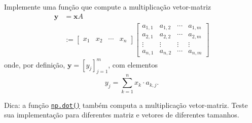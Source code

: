 \begin{exer}
  Implemente uma função que compute a multiplicação vetor-matriz
  \begin{subequations}
    \begin{align}
      \pmb{y} &= \pmb{x}A \\
              &:= \begin{bmatrix}
                x_1 & x_2 & \cdots & x_n
              \end{bmatrix}
                                     \begin{bmatrix}
                                       a_{1,1} & a_{1,2} & \cdots & a_{1,m}\\
                                       a_{2,1} & a_{2,2} & \cdots & a_{2,m}\\
                                       \vdots & \vdots & \vdots & \vdots\\
                                       a_{n,1} & a_{n,2} & \cdots & a_{n,m}
                                     \end{bmatrix}
    \end{align}
  \end{subequations}
  onde, por definição, $\pmb{y} = [y_j]_{j=1}^m$, com elementos
  \begin{equation}
    y_j = \sum_{k=1}^n x_k\cdot a_{k,j}.
  \end{equation}
\end{exer}
\begin{resp}
  Dica: a função \href{https://numpy.org/devdocs/reference/generated/numpy.dot.html}{\lstinline+np.dot()+} também computa a multiplicação vetor-matriz. Teste sua implementação para diferentes matriz e vetores de diferentes tamanhos.
\end{resp}